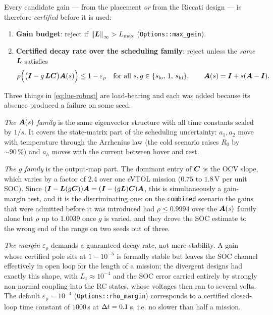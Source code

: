 Every candidate gain --- from the placement \emph{or} from the Riccati design --- is therefore
\emph{certified} before it is used:
\begin{enumerate}[nosep]
\item \textbf{Gain budget}: reject if $\left\lVert \bm{L} \right\rVert_\infty > L_{\max}$ (\texttt{Options::max\_gain}).
\item \textbf{Certified decay rate over the scheduling family}: reject unless the \emph{same}
$\bm{L}$ satisfies
\begin{equation}
\rho\Big(\big(\bm{I} - g\,\bm{L}\bm{C}\big)\bm{A}(s)\Big) \le 1-\varepsilon_\rho
\quad\text{for all }
s,g\in\{s_{\mathrm{lo}},\,1,\,s_{\mathrm{hi}}\},
\qquad \bm{A}(s) = \bm{I} + s(\bm{A} - \bm{I}).
\label{eq:lue-robust}
\end{equation}
\end{enumerate}
Three things in \eqref{eq:lue-robust} are load-bearing and each was added because its absence
produced a failure on some seed.

\emph{The $\bm{A}(s)$ family} is the same eigenvector structure with all time constants scaled by
$1/s$.  It covers the state-matrix part of the scheduling uncertainty: $a_1,a_2$ move with
temperature through the Arrhenius law (the cold scenario raises $R_0$ by $\sim\!90\,\%$) and $a_h$
moves with the current between hover and rest.

\emph{The $g$ family} is the output-map part.  The dominant entry of $\bm{C}$ is the OCV slope, which
varies by a factor of $2.4$ over one eVTOL mission ($0.75$ to $1.8$\,V per unit SOC).  Since
$(\bm{I} - \bm{L}(g\bm{C}))\bm{A} = (\bm{I} - (g\bm{L})\bm{C})\bm{A}$, this is simultaneously a gain-margin test, and it
is the discriminating one: on the \texttt{combined} scenario the gains that were admitted before
it was introduced had $\rho \le 0.9994$ over the $\bm{A}(s)$ family alone but $\rho$ up to $1.0039$
once $g$ is varied, and they drove the SOC estimate to the wrong end of the range on two seeds
out of three.

\emph{The margin $\varepsilon_\rho$} demands a guaranteed decay rate, not mere stability.  A gain
whose certified pole sits at $1-10^{-5}$ is formally stable but leaves the SOC channel effectively
in open loop for the length of a mission; the divergent designs had exactly this shape, with
$L_z \approx 10^{-4}$ and the SOC error carried entirely by strongly non-normal coupling into the
RC states, whose voltages then ran to several volts.  The default
$\varepsilon_\rho = 10^{-4}$ (\texttt{Options::rho\_margin}) corresponds to a certified closed-loop
time constant of $1000$\,s at $\Delta t = 0.1$\,s, i.e. no slower than half a mission.

